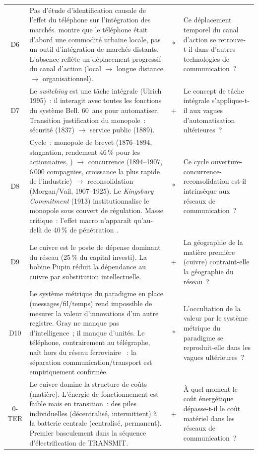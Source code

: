 \begin{table}[p]
\begin{tabularx}{\textwidth}{@{}cXcp{4.5cm}@{}}
D6 & Pas d'étude d'identification causale de l'effet du téléphone sur l'intégration des marchés. \textcite{ploeckl_market_2023} montre que le téléphone était d'abord une commodité urbaine locale, pas un outil d'intégration de marchés distants. L'absence reflète un déplacement progressif du canal d'action (local $\rightarrow$ longue distance $\rightarrow$ organisationnel). & * & Ce déplacement temporel du canal d'action se retrouve-t-il dans d'autres technologies de communication~? \\[3pt]
D7 & Le \emph{switching} est une tâche intégrale (Ulrich 1995)~: il interagit avec toutes les fonctions du système Bell. 60~ans pour automatiser. Transition justification du monopole~: sécurité (1837) $\rightarrow$ service public (1889). & + & Le concept de tâche intégrale s'applique-t-il aux vagues d'automatisation ultérieures~? \\[3pt]
D8 & Cycle~: monopole de brevet (1876--1894, stagnation, rendement 46\,\% pour les actionnaires, \textcite{gabel_early_1969}) $\rightarrow$ concurrence (1894--1907, 6\,000 compagnies, croissance la plus rapide de l'industrie) $\rightarrow$ reconsolidation (Morgan/Vail, 1907--1925). Le \emph{Kingsbury Commitment} (1913) institutionnalise le monopole sous couvert de régulation. Masse critique~: l'effet macro n'apparaît qu'au-delà de 40\,\% de pénétration \parencite{roller_telecommunications_2001}. & * & Ce cycle ouverture-concurrence-reconsolidation est-il intrinsèque aux réseaux de communication~? \\[3pt]
D9 & Le cuivre est le poste de dépense dominant du réseau (25\,\% du capital investi). La bobine Pupin réduit la dépendance au cuivre par substitution intellectuelle. & + & La géographie de la matière première (cuivre) contraint-elle la géographie du réseau~? \\[3pt]
D10 & Le système métrique du paradigme en place (messages/fil/temps) rend impossible de mesurer la valeur d'innovations d'un autre registre. Gray ne manque pas d'intelligence~; il manque d'unités. Le téléphone, contrairement au télégraphe, naît hors du réseau ferroviaire \parencite{ploeckl_market_2023}~: la séparation communication/transport est empiriquement confirmée. & * & L'occultation de la valeur par le système métrique du paradigme se reproduit-elle dans les vagues ultérieures~? \\[3pt]
\midrule
0-TER & Le cuivre domine la structure de coûts (matière). L'énergie de fonctionnement est faible mais en transition~: des piles individuelles (décentralisé, intermittent) à la batterie centrale (centralisé, permanent). Premier basculement dans la séquence d'électrification de TRANSMIT. & + & À quel moment le coût énergétique dépasse-t-il le coût matériel dans les réseaux de communication~? \\[3pt]
\bottomrule
\end{tabularx}
\renewcommand{\arraystretch}{1.0}
\end{table}



